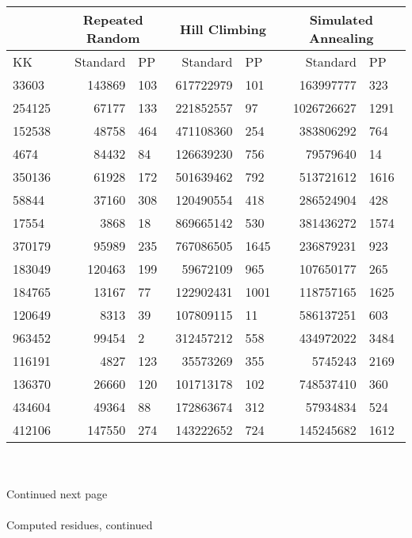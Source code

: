 \documentclass[11pt]{article}
\begin{document}
\begin{tabular}{l r l r l r l}
 & \multicolumn{2}{c}{Repeated Random} & \multicolumn{2}{c}{Hill Climbing} & \multicolumn{2}{c}{Simulated Annealing} \\ \hline
KK & Standard & PP & Standard & PP & Standard & PP \\ \hline
33603 & 143869 & 103 & 617722979 & 101 & 163997777 & 323 \\
254125 & 67177 & 133 & 221852557 & 97 & 1026726627 & 1291 \\
152538 & 48758 & 464 & 471108360 & 254 & 383806292 & 764 \\
4674 & 84432 & 84 & 126639230 & 756 & 79579640 & 14 \\
350136 & 61928 & 172 & 501639462 & 792 & 513721612 & 1616 \\
58844 & 37160 & 308 & 120490554 & 418 & 286524904 & 428 \\
17554 & 3868 & 18 & 869665142 & 530 & 381436272 & 1574 \\
370179 & 95989 & 235 & 767086505 & 1645 & 236879231 & 923 \\
183049 & 120463 & 199 & 59672109 & 965 & 107650177 & 265 \\
184765 & 13167 & 77 & 122902431 & 1001 & 118757165 & 1625 \\
120649 & 8313 & 39 & 107809115 & 11 & 586137251 & 603 \\
963452 & 99454 & 2 & 312457212 & 558 & 434972022 & 3484 \\
116191 & 4827 & 123 & 35573269 & 355 & 5745243 & 2169 \\
136370 & 26660 & 120 & 101713178 & 102 & 748537410 & 360 \\
434604 & 49364 & 88 & 172863674 & 312 & 57934834 & 524 \\
412106 & 147550 & 274 & 143222652 & 724 & 145245682 & 1612 \\

\end{tabular}
\\
\\
Continued next page\\
\\ Computed residues, continued \\
\\
\end{document}
